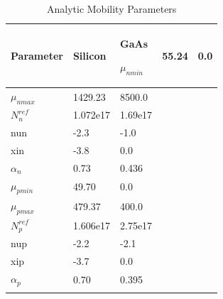 


\small

\begin{longtable}[htbp]{|
>{\setlength{\hsize}{0.5\hsize}}Y|
>{\setlength{\hsize}{0.5\hsize}}Y|
>{\setlength{\hsize}{0.5\hsize}}Y|} 
   \caption[Analytic Mobility Parameters]
    {Analytic Mobility Parameters \label{analytic}}
\\
\hline

\color{white}\bf Parameter &
\color{white}\bf Silicon &
\color{white}\bf GaAs \endhead  \hline

   $\mu_{nmin}$    &     55.24   & 0.0  \\ \hline
   $\mu_{nmax}$    &   1429.23   & 8500.0 \\ \hline
   $N_n^{ref}$     & 1.072e17    & 1.69e17 \\ \hline
   nun             &      -2.3   & -1.0    \\ \hline
   xin             &      -3.8   &  0.0    \\ \hline
   $\alpha_n$       &      0.73   &  0.436  \\ \hline
   $\mu_{pmin}$     &     49.70  &   0.0   \\ \hline
   $\mu_{pmax}$     &    479.37  & 400.0   \\ \hline
   $N_p^{ref}$      &  1.606e17  & 2.75e17 \\ \hline
   nup              &       -2.2 &    -2.1  \\ \hline
   xip              &       -3.7 &     0.0  \\ \hline
   $\alpha_p$       &       0.70 &  0.395   \\ \hline
\label{analyticMobModTbl}
\end{longtable}
